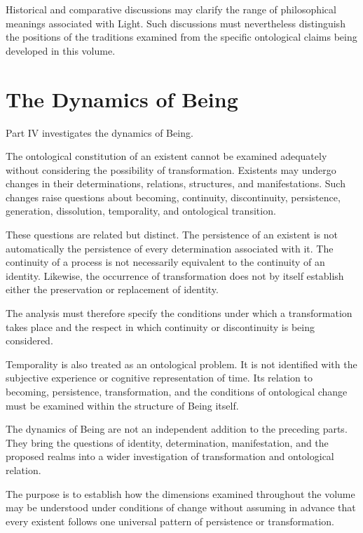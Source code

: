 Historical and comparative discussions
may clarify the range of philosophical
meanings associated with Light. Such
discussions must nevertheless distinguish
the positions of the traditions examined
from the specific ontological claims
being developed in this volume.



\section*{The Dynamics of Being}

Part IV investigates the dynamics of Being.

The ontological constitution of an existent
cannot be examined adequately without
considering the possibility of transformation.
Existents may undergo changes in their
determinations, relations, structures,
and manifestations. Such changes raise
questions about becoming, continuity,
discontinuity, persistence, generation,
dissolution, temporality, and ontological
transition.

These questions are related but distinct.
The persistence of an existent is not
automatically the persistence of every
determination associated with it. The
continuity of a process is not necessarily
equivalent to the continuity of an identity.
Likewise, the occurrence of transformation
does not by itself establish either the
preservation or replacement of identity.

The analysis must therefore specify the
conditions under which a transformation
takes place and the respect in which
continuity or discontinuity is being
considered.

Temporality is also treated as an ontological
problem. It is not identified with the
subjective experience or cognitive
representation of time. Its relation
to becoming, persistence, transformation,
and the conditions of ontological change
must be examined within the structure
of Being itself.

The dynamics of Being are not an
independent addition to the preceding
parts. They bring the questions of identity,
determination, manifestation, and the
proposed realms into a wider investigation
of transformation and ontological relation.

The purpose is to establish how the
dimensions examined throughout the
volume may be understood under conditions
of change without assuming in advance
that every existent follows one universal
pattern of persistence or transformation.


